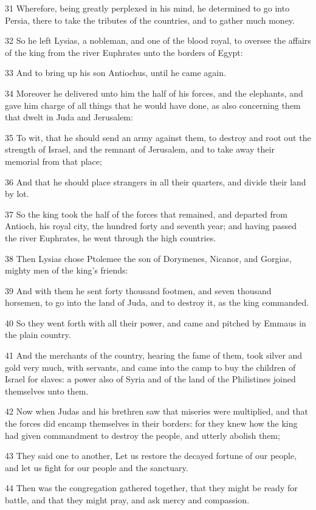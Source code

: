 \par 31 Wherefore, being greatly perplexed in his mind, he determined to go into Persia, there to take the tributes of the countries, and to gather much money.
\par 32 So he left Lysias, a nobleman, and one of the blood royal, to oversee the affairs of the king from the river Euphrates unto the borders of Egypt:
\par 33 And to bring up his son Antiochus, until he came again.
\par 34 Moreover he delivered unto him the half of his forces, and the elephants, and gave him charge of all things that he would have done, as also concerning them that dwelt in Juda and Jerusalem:
\par 35 To wit, that he should send an army against them, to destroy and root out the strength of Israel, and the remnant of Jerusalem, and to take away their memorial from that place;
\par 36 And that he should place strangers in all their quarters, and divide their land by lot.
\par 37 So the king took the half of the forces that remained, and departed from Antioch, his royal city, the hundred forty and seventh year; and having passed the river Euphrates, he went through the high countries.
\par 38 Then Lysias chose Ptolemee the son of Dorymenes, Nicanor, and Gorgias, mighty men of the king's friends:
\par 39 And with them he sent forty thousand footmen, and seven thousand horsemen, to go into the land of Juda, and to destroy it, as the king commanded.
\par 40 So they went forth with all their power, and came and pitched by Emmaus in the plain country.
\par 41 And the merchants of the country, hearing the fame of them, took silver and gold very much, with servants, and came into the camp to buy the children of Israel for slaves: a power also of Syria and of the land of the Philistines joined themselves unto them.
\par 42 Now when Judas and his brethren saw that miseries were multiplied, and that the forces did encamp themselves in their borders: for they knew how the king had given commandment to destroy the people, and utterly abolish them;
\par 43 They said one to another, Let us restore the decayed fortune of our people, and let us fight for our people and the sanctuary.
\par 44 Then was the congregation gathered together, that they might be ready for battle, and that they might pray, and ask mercy and compassion.
